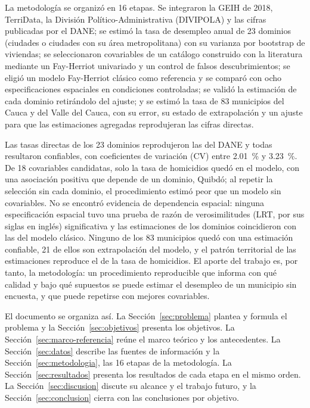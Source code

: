 La metodología se organizó en 16 etapas. Se integraron la GEIH de 2018, TerriData, la División Político-Administrativa (DIVIPOLA) y las cifras publicadas por el DANE; se estimó la tasa de desempleo anual de 23 dominios (ciudades o ciudades con su área metropolitana) con su varianza por bootstrap de viviendas; se seleccionaron covariables de un catálogo construido con la literatura mediante un Fay-Herriot univariado y un control de falsos descubrimientos; se eligió un modelo Fay-Herriot clásico como referencia y se comparó con ocho especificaciones espaciales en condiciones controladas; se validó la estimación de cada dominio retirándolo del ajuste; y se estimó la tasa de 83 municipios del Cauca y del Valle del Cauca, con su error, su estado de extrapolación y un ajuste para que las estimaciones agregadas reprodujeran las cifras directas.

Las tasas directas de los 23 dominios reprodujeron las del DANE y todas resultaron confiables, con coeficientes de variación (CV) entre 2.01~\% y 3.23~\%. De 18 covariables candidatas, solo la tasa de homicidios quedó en el modelo, con una asociación positiva que depende de un dominio, Quibdó; al repetir la selección sin cada dominio, el procedimiento estimó peor que un modelo sin covariables. No se encontró evidencia de dependencia espacial: ninguna especificación espacial tuvo una prueba de razón de verosimilitudes (LRT, por sus siglas en inglés) significativa y las estimaciones de los dominios coincidieron con las del modelo clásico. Ninguno de los 83 municipios quedó con una estimación confiable, 21 de ellos son extrapolación del modelo, y el patrón territorial de las estimaciones reproduce el de la tasa de homicidios. El aporte del trabajo es, por tanto, la metodología: un procedimiento reproducible que informa con qué calidad y bajo qué supuestos se puede estimar el desempleo de un municipio sin encuesta, y que puede repetirse con mejores covariables.

El documento se organiza así. La Sección~\ref{sec:problema} plantea y formula el problema y la Sección~\ref{sec:objetivos} presenta los objetivos. La Sección~\ref{sec:marco-referencia} reúne el marco teórico y los antecedentes. La Sección~\ref{sec:datos} describe las fuentes de información y la Sección~\ref{sec:metodologia}, las 16 etapas de la metodología. La Sección~\ref{sec:resultados} presenta los resultados de cada etapa en el mismo orden. La Sección~\ref{sec:discusion} discute su alcance y el trabajo futuro, y la Sección~\ref{sec:conclusion} cierra con las conclusiones por objetivo.
